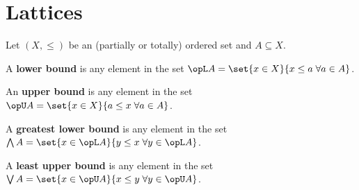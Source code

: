 
\chapter{Lattices}
\label{chp:lattice}
%



\begin{definition}
Let $(X,\le)$ be an (partially or totally) ordered set and $A\subseteq X$.

A {\bf lower bound} is any element in the set
$\opL A=\set{x\in X}{x\le a \; \forall a\in A}$.

An {\bf upper bound} is any element in the set
$\opU A=\set{x\in X}{a\le x \; \forall a\in A}$.

A {\bf greatest lower bound} is any element in the set 
$\bigwedge A = \set{x\in \opL A}{y\le x\; \forall y\in\opL A}$.

A {\bf least upper bound} is any element in the set 
$\bigvee A = \set{x\in \opU A}{x\le y\; \forall y\in\opU A}$.
\end{definition}

